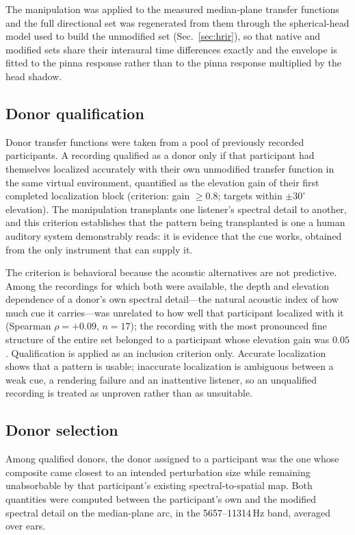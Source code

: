 The manipulation was applied to the measured median-plane transfer functions
and the full directional set was regenerated from them through the
spherical-head model used to build the unmodified set (Sec.~\ref{sec:hrir}), so
that native and modified sets share their interaural time differences exactly
and the envelope is fitted to the pinna response rather than to the pinna
response multiplied by the head shadow.

\subsection{Donor qualification}

Donor transfer functions were taken from a pool of previously recorded
participants. A recording qualified as a donor only if that participant had
themselves localized accurately with their own unmodified transfer function in
the same virtual environment, quantified as the elevation gain of their first
completed localization block (criterion: gain $\geq 0.8$; targets within
$\pm30^\circ$ elevation). The manipulation transplants one listener's spectral
detail to another, and this criterion establishes that the pattern being
transplanted is one a human auditory system demonstrably reads: it is evidence
that the cue works, obtained from the only instrument that can supply it.

The criterion is behavioral because the acoustic alternatives are not
predictive. Among the recordings for which both were available, the depth and
elevation dependence of a donor's own spectral detail---the natural acoustic
index of how much cue it carries---was unrelated to how well that participant
localized with it (Spearman $\rho = +0.09$, $n = 17$); the recording with the
most pronounced fine structure of the entire set belonged to a participant whose
elevation gain was $0.05$. Qualification is applied as an inclusion criterion
only. Accurate localization shows that a pattern is usable; inaccurate
localization is ambiguous between a weak cue, a rendering failure and an
inattentive listener, so an unqualified recording is treated as unproven rather
than as unsuitable.

\subsection{Donor selection}

Among qualified donors, the donor assigned to a participant was the one whose
composite came closest to an intended perturbation size while remaining
unabsorbable by that participant's existing spectral-to-spatial map. Both
quantities were computed between the participant's own and the modified spectral
detail on the median-plane arc, in the 5657--11314\,Hz band, averaged over ears.

